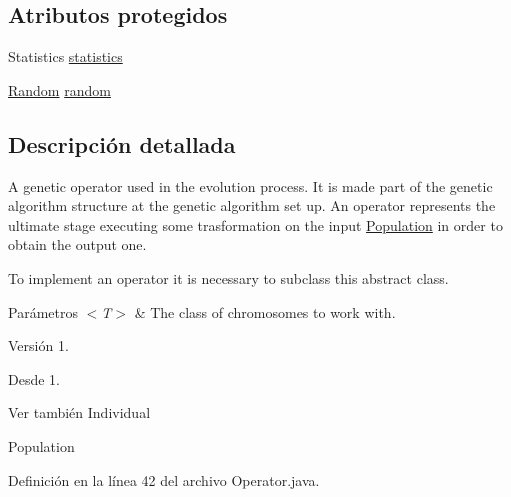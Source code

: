 \subsection*{Atributos protegidos}
\begin{DoxyCompactItemize}
\item 
Statistics \hyperlink{classjenes_1_1stage_1_1operator_1_1_operator_3_01_t_01extends_01_chromosome_01_4_a45afa214a1e9109845c8f67165942675}{statistics}
\item 
\hyperlink{classjenes_1_1utils_1_1_random}{Random} \hyperlink{classjenes_1_1stage_1_1operator_1_1_operator_3_01_t_01extends_01_chromosome_01_4_af8cbd8837ce95101e238bdcc3dce5573}{random}
\end{DoxyCompactItemize}


\subsection{Descripción detallada}
A genetic operator used in the evolution process. It is made part of the genetic algorithm structure at the genetic algorithm set up. An operator represents the ultimate stage executing some trasformation on the input \hyperlink{}{Population} in order to obtain the output one. 

To implement an operator it is necessary to subclass this abstract class.


\begin{DoxyParams}{Parámetros}
{\em $<$\-T$>$} & The class of chromosomes to work with.\\
\hline
\end{DoxyParams}
\begin{DoxyVersion}{Versión}
1. 
\end{DoxyVersion}
\begin{DoxySince}{Desde}
1.
\end{DoxySince}
\begin{DoxySeeAlso}{Ver también}
Individual 

Population 
\end{DoxySeeAlso}


Definición en la línea 42 del archivo Operator.\-java.



